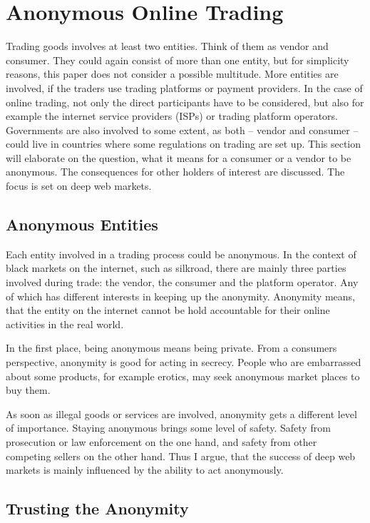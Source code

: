 \section{Anonymous Online Trading}
\label{trading}

Trading goods involves at least two entities. Think of them as vendor and consumer. They could again consist of more than one entity, but for simplicity reasons, this paper does not consider a possible multitude. More entities are involved, if the traders use trading platforms or payment providers. In the case of online trading, not only the direct participants have to be considered, but also for example the internet service providers (ISPs) or trading platform operators. Governments are also involved to some extent, as both -- vendor and consumer -- could live in countries where some regulations on trading are set up.
This section will elaborate on the question, what it means for a consumer or a vendor to be anonymous. The consequences for other holders of interest are discussed. The focus is set on deep web markets.

\subsection{Anonymous Entities}

Each entity involved in a trading process could be anonymous. In the context of black markets on the internet, such as silkroad\cite{silkroad2013}, there are mainly three parties involved during trade: the vendor, the consumer and the platform operator. Any of which has different interests in keeping up the anonymity. Anonymity means, that the entity on the internet cannot be hold accountable for their online activities in the real world\cite{accountability2014}.

In the first place, being anonymous means being private. From a consumers perspective, anonymity is good for acting in secrecy. People who are embarrassed about some products, for example erotics, may seek anonymous market places to buy them.

As soon as illegal goods or services are involved, anonymity gets a different level of importance. Staying anonymous brings some level of safety. Safety from prosecution or law enforcement on the one hand, and safety from other competing sellers on the other hand. Thus I argue, that the success of deep web markets is mainly influenced by the ability to act anonymously.


\subsection{Trusting the Anonymity}

